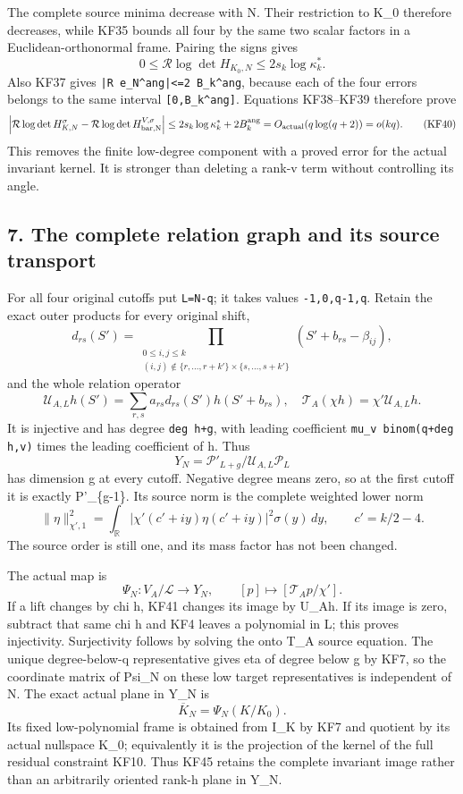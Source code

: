 The complete source minima decrease with N. Their restriction to K\_0 therefore decreases, while KF35 bounds all four by the same two scalar factors in a Euclidean-orthonormal frame. Pairing the signs gives \[
0\le\mathcal R\log\det H_{K_0,N}
\le2s_k\log\kappa_k^*.
\tag{KF39}
\] Also KF37 gives \nolinkurl{|R e_N^ang|<=2 B_k^ang}, because each of the four errors belongs to the same interval \texttt{{[}0,B\_k\^{}ang{]}}. Equations KF38--KF39 therefore prove \[
\left|\mathcal R\log\det H_{K,N}^{\sigma}
-\mathcal R\log\det H_{\rm bar,N}^{V,\sigma}\right|
\le2s_k\log\kappa_k^*+2B_k^{\rm ang}
=O_{\rm actual}(q\log(q+2))=o(kq).
\tag{KF40}
\] This removes the finite low-degree component with a proved error for the actual invariant kernel. It is stronger than deleting a rank-v term without controlling its angle.

\subsection{7. The complete relation graph and its source transport}\label{the-complete-relation-graph-and-its-source-transport}

For all four original cutoffs put \texttt{L=N-q}; it takes values \texttt{-1,0,q-1,q}. Retain the exact outer products for every original shift, \[
d_{rs}(S')=\prod_{\substack{0\le i,j\le k\\
(i,j)\notin\{r,\ldots,r+k'\}\times\{s,\ldots,s+k'\}}}
(S'+b_{rs}-\beta_{ij}),
\] and the whole relation operator \[
\mathcal U_{A,L}h(S')=\sum_{r,s}a_{rs}d_{rs}(S')h(S'+b_{rs}),
\quad \mathcal T_A(\chi h)=\chi'\mathcal U_{A,L}h.
\tag{KF41}
\] It is injective and has degree \texttt{deg\ h+g}, with leading coefficient \nolinkurl{mu_v binom(q+deg h,v)} times the leading coefficient of h. Thus \[
Y_N=\mathcal P'_{L+g}/\mathcal U_{A,L}\mathcal P_L
\tag{KF42}
\] has dimension g at every cutoff. Negative degree means zero, so at the first cutoff it is exactly P'\_\{g-1\}. Its source norm is the complete weighted lower norm \[
\|\eta\|_{\chi',1}^2=
\int_{\mathbb R}|\chi'(c'+iy)\eta(c'+iy)|^2\sigma(y)\,dy,
\qquad c'=k/2-4.
\tag{KF43}
\] The source order is still one, and its mass factor has not been changed.

The actual map is \[
\Psi_N:V_A/\mathcal L\longrightarrow Y_N,
\qquad [p]\longmapsto[\mathcal T_Ap/\chi'].
\tag{KF44}
\] If a lift changes by chi h, KF41 changes its image by U\_Ah. If its image is zero, subtract that same chi h and KF4 leaves a polynomial in L; this proves injectivity. Surjectivity follows by solving the onto T\_A source equation. The unique degree-below-q representative gives eta of degree below g by KF7, so the coordinate matrix of Psi\_N on these low target representatives is independent of N. The exact actual plane in Y\_N is \[
\overline K_N=\Psi_N(K/ K_0).
\tag{KF45}
\] Its fixed low-polynomial frame is obtained from I\_K by KF7 and quotient by its actual nullspace K\_0; equivalently it is the projection of the kernel of the full residual constraint KF10. Thus KF45 retains the complete invariant image rather than an arbitrarily oriented rank-h plane in Y\_N.

